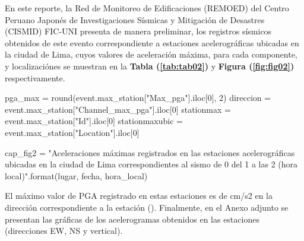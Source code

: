 \documentclass[11pt, a4paper]{report}
\begin{document}
\vspace{1cm}

\noindent
En este reporte, la Red de Monitoreo de Edificaciones (REMOED) del Centro Peruano Japonés de Investigaciones Sísmicas y Mitigación
de Desastres (CISMID) FIC-UNI presenta de manera preliminar, los registros sísmicos obtenidos de este evento correspondiente a 
 estaciones acelerográficas ubicadas en la ciudad de Lima, cuyos valores de aceleración máxima, para cada 
componente, y localizaciónes se muestran en la \textbf{Tabla (\ref{tab:tab02})} y \textbf{Figura (\ref{fig:fig02})} respectivamente.\\

\begin{pycode}
pga_max = round(event.max_station["Max_pga"].iloc[0], 2)
direccion = event.max_station["Channel_max_pga"].iloc[0]
stationmax = event.max_station["Id"].iloc[0]
stationmaxubic = event.max_station["Location"].iloc[0]

cap_fig2 = "Aceleraciones máximas registrados en las estaciones acelerográficas ubicadas en la ciudad de Lima correspondientes al sismo de {0} del {1} a las {2} (hora local)".format(lugar, fecha, hora_local)

\end{pycode}

\newpage
\noindent
El máximo valor de PGA registrado en estas estaciones es de  cm/s2 en la dirección  
correspondiente a la estación  ().
Finalmente, en el Anexo adjunto se presentan las gráficas de los acelerogramas obtenidos 
en las  estaciones (direcciones EW, NS y vertical).
\end{document}
